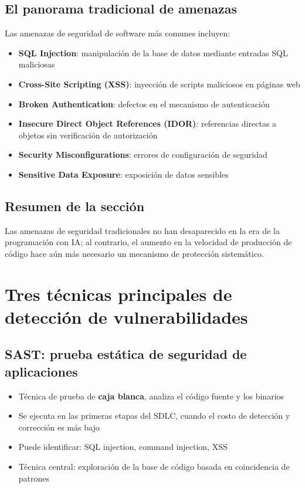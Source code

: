 \documentclass[a4paper]{article}
\begin{document}
\subsection{El panorama tradicional de amenazas}

Las amenazas de seguridad de software más comunes incluyen:
\begin{itemize}
    \item \textbf{SQL Injection}: manipulación de la base de datos mediante entradas SQL maliciosas
    \item \textbf{Cross-Site Scripting (XSS)}: inyección de scripts maliciosos en páginas web
    \item \textbf{Broken Authentication}: defectos en el mecanismo de autenticación
    \item \textbf{Insecure Direct Object References (IDOR)}: referencias directas a objetos sin verificación de autorización
    \item \textbf{Security Misconfigurations}: errores de configuración de seguridad
    \item \textbf{Sensitive Data Exposure}: exposición de datos sensibles
\end{itemize}

\subsection{Resumen de la sección}

Las amenazas de seguridad tradicionales no han desaparecido en la era de la programación con IA; al contrario, el aumento en la velocidad de producción de código hace aún más necesario un mecanismo de protección sistemático.

\section{Tres técnicas principales de detección de vulnerabilidades}

\subsection{SAST: prueba estática de seguridad de aplicaciones}

\begin{itemize}
    \item Técnica de prueba de \textbf{caja blanca}, analiza el código fuente y los binarios
    \item Se ejecuta en las primeras etapas del SDLC, cuando el costo de detección y corrección es más bajo
    \item Puede identificar: SQL injection, command injection, XSS
    \item Técnica central: exploración de la base de código basada en coincidencia de patrones
\end{itemize}
\end{document}
